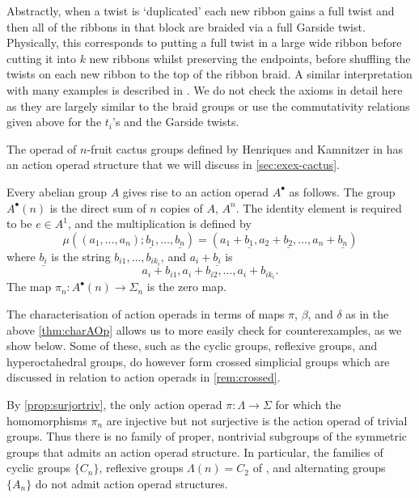 \begin{example}
Abstractly, when a twist is `duplicated' each new ribbon gains a full twist and then all of the ribbons in that block are braided via a full Garside twist. Physically, this corresponds to putting a full twist in a large wide ribbon before cutting it into $k$ new ribbons whilst preserving the endpoints, before shuffling the twists on each new ribbon to the top of the ribbon braid. A similar interpretation with many examples is described in \cite[Chapter 6]{yau_infinity_2021}. We do not check the axioms in detail here as they are largely similar to the braid groups or use the commutativity relations given above for the $t_i$'s and the Garside twists.
\end{example}

\begin{example}\label{ex:cactus-aop}
The operad of $n$-fruit cactus groups defined by Henriques and Kamnitzer in \cite{hk-cobound} has an action operad structure that we will discuss in \cref{sec:exex-cactus}.
\end{example}

\begin{example}\label{ex:abgp-aop}
Every abelian group $A$ gives rise to an action operad $A^{\bullet}$ as follows. The group $A^{\bullet}(n)$ is the direct sum of $n$ copies of $A$, $A^{n}$. The identity element is required to be $e \in A^{1}$, and the multiplication is defined by
  \[
    \mu((a_{1}, \ldots, a_{n}); \underline{b_1}, \ldots, \underline{b_n}) = (a_{1}+\underline{b_{1}}, a_{2} + \underline{b_{2}}, \ldots, a_{n} + \underline{b_{n}})
  \]
where $\underline{b_{i}}$ is the string $b_{i1}, \ldots, b_{ik_{i}}$, and $a_{i} + \underline{b_{i}}$ is
  \[
    a_{i} + b_{i1}, a_{i} + b_{i2}, \ldots, a_{i} + b_{ik_{i}}.
  \]
The map $\pi_n \colon A^\bullet(n) \rightarrow \Sigma_n$ is the zero map. 
\end{example}

The characterisation of action operads in terms of maps $\pi$, $\beta$, and $\delta$ as in the above \cref{thm:charAOp} allows us to more easily check for counterexamples, as we show below. Some of these, such as the cyclic groups, reflexive groups, and hyperoctahedral groups, do however form crossed simplicial groups which are discussed in relation to action operads in \cref{rem:crossed}.

\begin{nonex}\label{nonex:counterex1}
By \cref{prop:surjortriv}, the only action operad $\pi \colon \Lambda \to \Sigma$ for which the homomorphisms $\pi_n$ are injective but not surjective is the action operad of trivial groups. 
Thus there is no family of proper, nontrivial subgroups of the symmetric groups that admits an action operad structure.
In particular, the families of cyclic groups $\{ C_n \}$, reflexive groups $\Lambda(n) = C_2$ of \cite{Kra87}, and alternating groups $\{ A_n \}$ do not admit action operad structures.
\end{nonex}

